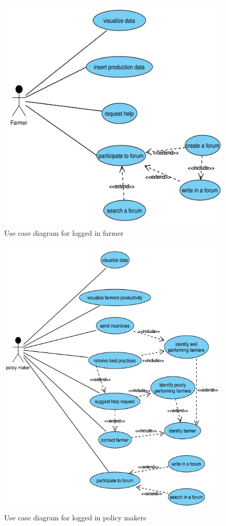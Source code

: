 \begin{figure}[H]
	\centering
	\includegraphics[width=\textwidth]{Images/use-case-farmer.png}
	\caption{\label{fig:usecasefarmer}Use case diagram for logged in farmer}
\end{figure}

\begin{figure}[H]
	\centering
	\includegraphics[width=\textwidth]{Images/use-case-policy.png}
	\caption{\label{fig:usecasepolicymakers}Use case diagram for logged in policy makers}
\end{figure}

